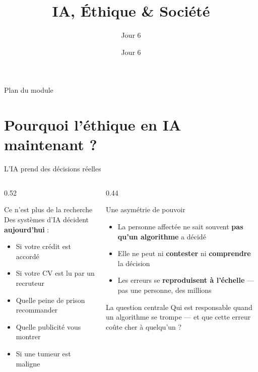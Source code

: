 \documentclass[aspectratio=169, 10pt]{beamer}
\title[Éthique \& IA]{IA, Éthique \& Société}
\subtitle{Jour 6}
\date{Jour 6}
\begin{document}

\begin{frame}
  \titlepage
\end{frame}

\begin{frame}{Plan du module}
  \tableofcontents
\end{frame}

\section{Pourquoi l'éthique en IA maintenant ?}

\begin{frame}{L'IA prend des décisions réelles}
  \begin{columns}[T]
    \begin{column}{0.52\textwidth}
      \begin{alertblock}{Ce n'est plus de la recherche}
        Des systèmes d'IA décident \textbf{aujourd'hui} :
        \begin{itemize}
          \item Si votre crédit est accordé
          \item Si votre CV est lu par un recruteur
          \item Quelle peine de prison recommander
          \item Quelle publicité vous montrer
          \item Si une tumeur est maligne
        \end{itemize}
      \end{alertblock}
    \end{column}
    \begin{column}{0.44\textwidth}
      \begin{block}{Une asymétrie de pouvoir}
        \begin{itemize}
          \item La personne affectée ne sait souvent
                \textbf{pas qu'un algorithme} a décidé
          \item Elle ne peut ni \textbf{contester}
                ni \textbf{comprendre} la décision
          \item Les erreurs se \textbf{reproduisent à l'échelle}
                — pas une personne, des millions
        \end{itemize}
      \end{block}
      \smallskip
      \begin{exampleblock}{La question centrale}
        Qui est responsable quand un algorithme
        se trompe — et que cette erreur coûte cher
        à quelqu'un ?
      \end{exampleblock}
    \end{column}
  \end{columns}
\end{frame}
\end{document}
